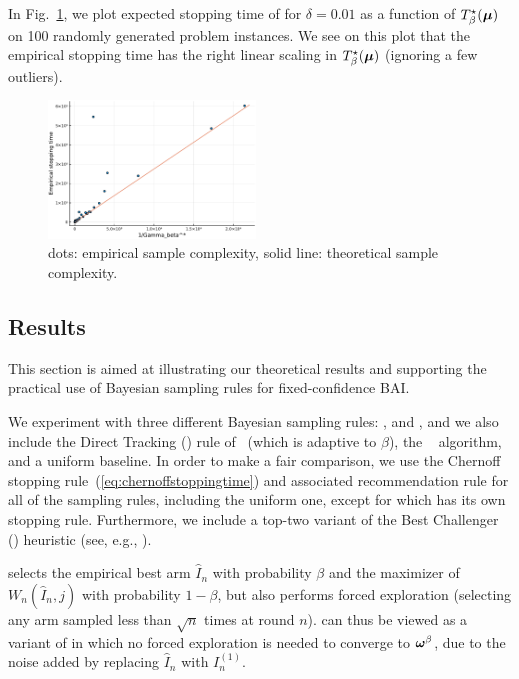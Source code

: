 In Fig.~\ref{fig:t3c.hardness}, we plot expected stopping time of \TCC for $\delta = 0.01$ as a function of $T_{\beta}^\star({\boldsymbol \mu})$ on 100 randomly generated problem instances. We see on this plot that the empirical stopping time has the right linear scaling in $T_{\beta}^\star({\boldsymbol \mu})$ (ignoring a few outliers).

\begin{figure}[ht]
    \centering
    \includegraphics[width=0.49\textwidth]{Chapter3/img/hardness.pdf}
    \caption{dots: empirical sample complexity, solid line: theoretical sample complexity.}
    \label{fig:t3c.hardness}
\end{figure}

\subsection{Results}\label{sec:t3c.experiments.results}
This section is aimed at illustrating our theoretical results and supporting the practical use of Bayesian sampling rules for fixed-confidence BAI.   %

We experiment with three different Bayesian sampling rules: \TCC, \TTTS and \TTEI, and we also include the Direct Tracking (\DT) rule of~\cite{garivier2016tracknstop} (which is adaptive to $\beta$), the \UGapE~\citep{gabillon2012ugape} algorithm, and a uniform baseline. In order to make a fair comparison, we use the Chernoff stopping rule~(\ref{eq:chernoffstoppingtime}) and associated recommendation rule for all of the sampling rules, including the uniform one, except for \UGapE which has its own stopping rule. Furthermore, we include a top-two variant of the Best Challenger (\BC) heuristic (see, e.g., \citealp{menard2019lma}). 

\BC selects the empirical best arm $\hat{I}_n$ with probability $\beta$ and the maximizer of $W_n(\hat{I}_n,j)$ with probability $1-\beta$, but also performs forced exploration (selecting any arm sampled less than $\sqrt{n}$ times at round $n$). \TCC can thus be viewed as a variant of \BC in which no forced exploration is needed to converge to ${\boldsymbol \omega}^\beta$, due to the noise added by replacing $\hat{I}_n$ with $I_n^{(1)}$.

